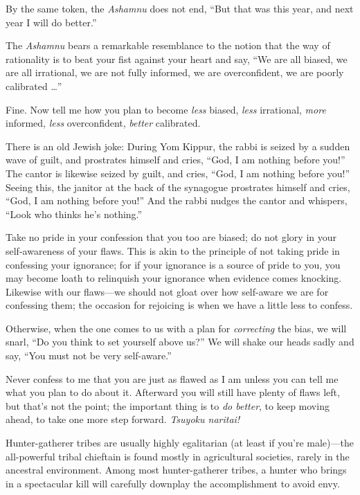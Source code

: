 {
 By the same token, the \textit{Ashamnu} does not end,
``But that was this year, and next year I will do
better.''}

{
 The \textit{Ashamnu} bears a remarkable resemblance to the notion
that the way of rationality is to beat your fist against your heart and
say, ``We are all biased, we are all irrational, we
are not fully informed, we are overconfident, we are poorly calibrated
\ldots''}

{
 Fine. Now tell me how you plan to become \textit{less} biased,
\textit{less} irrational, \textit{more} informed, \textit{less}
overconfident, \textit{better} calibrated.}

{
 There is an old Jewish joke: During Yom Kippur, the rabbi is
seized by a sudden wave of guilt, and prostrates himself and cries,
``God, I am nothing before you!''
The cantor is likewise seized by guilt, and cries,
``God, I am nothing before you!''
Seeing this, the janitor at the back of the synagogue prostrates
himself and cries, ``God, I am nothing before
you!'' And the rabbi nudges the cantor and whispers,
``Look who thinks he's
nothing.''}

{
 Take no pride in your confession that you too are biased; do not
glory in your self-awareness of your flaws. This is akin to the
principle of not taking pride in confessing your ignorance; for if your
ignorance is a source of pride to you, you may become loath to
relinquish your ignorance when evidence comes knocking. Likewise with
our flaws---we should not gloat over how self-aware we are for
confessing them; the occasion for rejoicing is when we have a little
less to confess.}

{
 Otherwise, when the one comes to us with a plan for
\textit{correcting} the bias, we will snarl, ``Do you
think to set yourself above us?'' We will shake our
heads sadly and say, ``You must not be very
self-aware.''}

{
 Never confess to me that you are just as flawed as I am unless you
can tell me what you plan to do about it. Afterward you will still have
plenty of flaws left, but that's not the point; the
important thing is to \textit{do better}, to keep moving ahead, to take
one more step forward. \textit{Tsuyoku naritai!}}

\myendsectiontext


{
 Hunter-gatherer tribes are usually highly egalitarian (at least if
you're male)---the all-powerful tribal chieftain is
found mostly in agricultural societies, rarely in the ancestral
environment. Among most hunter-gatherer tribes, a hunter who brings in
a spectacular kill will carefully downplay the accomplishment to avoid
envy. }

